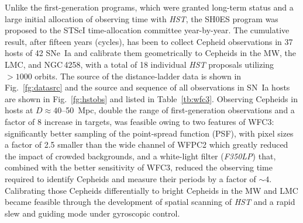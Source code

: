 \documentclass[12pt]{aastex631}
\begin{document}
\clearpage

Unlike the first-generation programs, which were granted long-term status and a large initial allocation of observing time with {\it HST}, the SH0ES program was proposed to the STScI time-allocation committee year-by-year. The cumulative result, after fifteen years (cycles), has been to collect Cepheid observations in 37 hosts of 42 SNe~Ia and calibrate them geometrically to Cepheids in the MW, the LMC, and NGC$\,$4258, with a total of 18 individual {\it HST} proposals utilizing $> 1000$ orbits.  The source of the distance-ladder data is shown in Fig.~\ref{fg:datasrc} and the source and sequence of all observations in SN~Ia hosts are shown in Fig.~\ref{fg:hstobs} and listed in Table~\ref{tb:wfc3}.  Observing Cepheids in hosts at $D \approx 40$--50~Mpc, double the range of first-generation observations and a factor of 8 increase in targets, was feasible owing to two features of WFC3: significantly better sampling of the point-spread function (PSF), with pixel sizes a factor of 2.5 smaller than the wide channel of WFPC2 which greatly reduced the impact of crowded backgrounds, and a white-light filter ({\it F350LP}) that, combined with the better sensitivity of WFC3, reduced the observing time required to identify Cepheids and measure their periods by a factor of $\sim 4$. Calibrating those Cepheids differentially to bright Cepheids in the MW and LMC became feasible through the development of spatial scanning of {\it HST} and a rapid slew and guiding mode under gyroscopic control.
\end{document}
